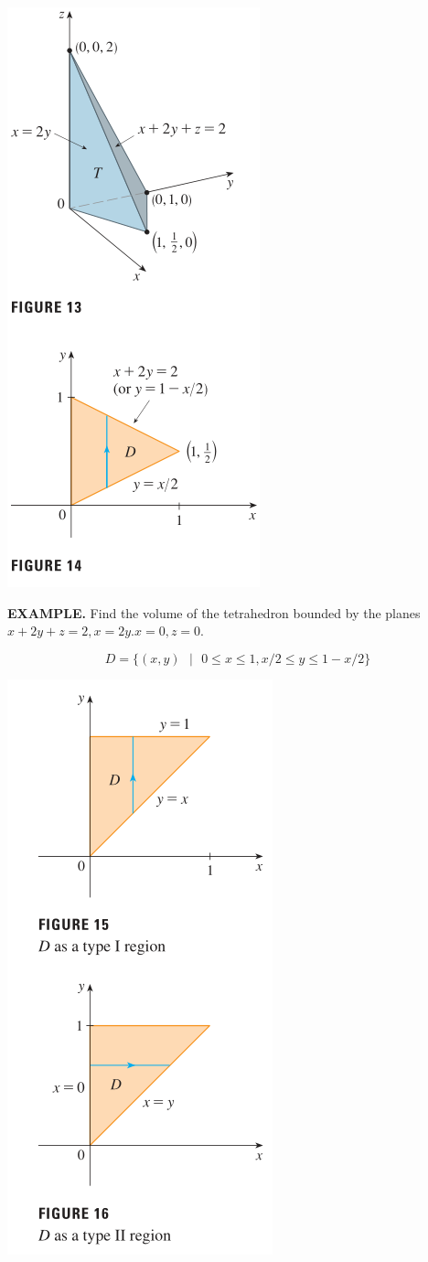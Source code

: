\documentclass{article}
\begin{document}
\begin{minipage}[]{0.3\linewidth}
  \begin{center}
    \includegraphics[width = 4.3 cm]{images/type2eg4.png} 
  \end{center}
  
\end{minipage}
\begin{minipage}[]{0.67\linewidth}
  {\selectfont \textbf{\textcolor{blue5}{ EXAMPLE.}}} Find the volume of the tetrahedron bounded by the planes $x + 2y + z = 2, x = 2y. x = 0, z = 0 $.

  \[D = \big\{ (x,y) \text{ } | \text{ } 0 \le x \le 1, x/2 \le y \le 1 - x/2\big\}\]
  

\end{minipage}
\begin{minipage}[]{0.3\linewidth}
  \begin{center}
    \includegraphics[width = 4.3 cm]{images/IIeg5.png} 
  \end{center}
  
\end{minipage}
\end{document}
